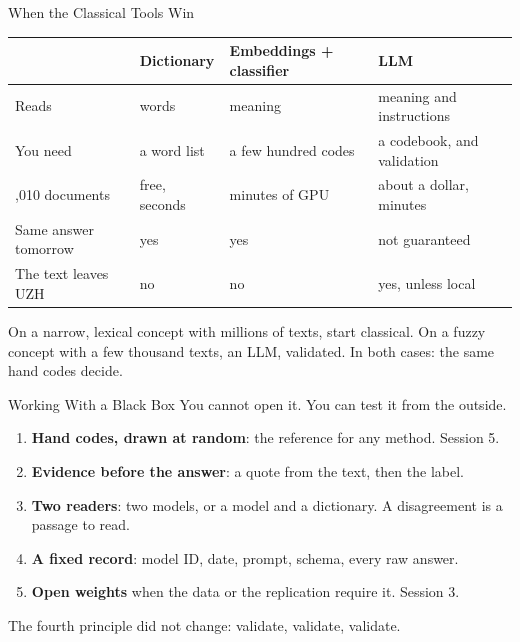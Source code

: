 \documentclass[svgnames,x11names,dvipsnames]{beamer}
\newcommand{\chg}[1]{{\bfseries #1}}
\renewcommand{\chg}[1]{#1}
\begin{document}
\begin{frame}{When the Classical Tools Win}
\footnotesize
\renewcommand{\arraystretch}{1.5}
\begin{tabular}{@{}>{\raggedright\arraybackslash}p{2.4cm}>{\raggedright\arraybackslash}p{2.3cm}>{\raggedright\arraybackslash}p{2.6cm}>{\raggedright\arraybackslash}p{2.6cm}@{}}
\toprule
& \textbf{Dictionary} & \textbf{Embeddings + classifier} & \textbf{LLM} \\
\midrule
Reads & words & meaning & meaning and instructions \\
You need & a word list & a few hundred codes & a codebook, and validation \\
4,010 documents & free, seconds & minutes of GPU & about a dollar, minutes \\
Same answer tomorrow & yes & yes & not guaranteed \\
The text leaves UZH & no & no & yes, unless local \\
\bottomrule
\end{tabular}

\vspace{0.5cm}
\small
On a narrow, lexical concept with millions of texts, start classical. On a fuzzy concept with a few thousand texts, an LLM, validated. In both cases: the same hand codes decide.
\end{frame}

\begin{frame}{\chg{Working With a Black Box}}
\small
You cannot open it. You can test it from the outside.

\vspace{0.3cm}
\begin{enumerate}
    \setlength{\itemsep}{5pt}
    \item \textbf{Hand codes, drawn at random}: the reference for any method. Session 5.
    \item \textbf{Evidence before the answer}: a quote from the text, then the label.
    \item \textbf{Two readers}: two models, or a model and a dictionary. A disagreement is a passage to read.
    \item \textbf{A fixed record}: model ID, date, prompt, schema, every raw answer.
    \item \textbf{Open weights} when the data or the replication require it. Session 3.
\end{enumerate}

\vspace{0.4cm}
\centering
\alert{The fourth principle did not change: validate, validate, validate.}
\end{frame}
\end{document}
